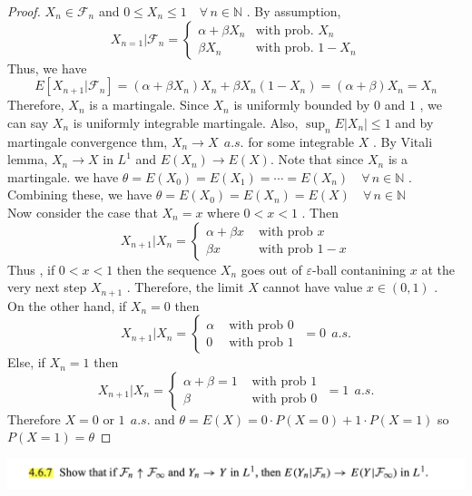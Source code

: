 \documentclass[12pt, A4]{article}
\newcommand{\N}{\mathbb{N}}
\newcommand{\F}{\mathcal{F}}
\newcommand{\foranyn}{\quad \forall \, n\in \N}
\begin{document}
\begin{proof}
   $X_n\in \F_n$ and $0\leq X_n\leq 1\foranyn$ . By assumption, 
   $$X_{n=1}|\F_n = \begin{cases}
    \alpha +\beta X_n & \text{with prob. } X_n \\ \beta X_n & \text{with prob. } 1-X_n      
   \end{cases}
   $$
   Thus, we have $$E[X_{n+1}|\F_n] = (\alpha+\beta X_n)X_n +\beta X_n(1-X_n) = (\alpha+\beta)X_n = X_n $$
   Therefore, $X_n$ is a martingale. Since $X_n$ is uniformly bounded by $0$ and $1$ , we can say $X_n$ is uniformly integrable martingale. Also, $\sup_n E|X_n|\leq 1$ and by martingale convergence thm, $X_n\rightarrow X\;\,a.s.$ for some integrable $X$ . By Vitali lemma, $X_n\rightarrow X$ in $L^1$ and $E(X_n)\rightarrow E(X)$. Note that since $X_n$ is a martingale. we have $\theta = E(X_0) = E(X_1) = \cdots = E(X_n)\foranyn$ . Combining these, we have $\theta = E(X_0) = E(X_n) = E(X)\foranyn$ \\
   Now consider the case that $X_n = x$ where $0<x<1$ . Then $$ X_{n+1} |X_n =\begin{cases}
       \alpha + \beta x & \text{ with prob } x \\ \beta x & \text{ with prob } 1-x
   \end{cases} $$
   Thus , if $0<x<1$ then the sequence $X_n$ goes out of $\varepsilon$-ball contanining $x$ at the very next step $X_{n+1}$ . Therefore, the limit $X$ cannot have value $x \in (0,1)$ . \\ On the other hand, if $X_n = 0 $ then $$X_{n+1}|X_n =\begin{cases}
       \alpha & \text{ with prob } 0 \\ 0 & \text{ with prob } 1 
   \end{cases} \;= 0\;\,a.s.$$ Else, if $X_n = 1$ then $$X_{n+1}|X_n =\begin{cases}
    \alpha+\beta =1 & \text{ with prob } 1 \\ \beta & \text{ with prob } 0  
\end{cases} \;= 1\;\,a.s.$$ Therefore $X = 0$ or $1\;\,a.s.$ and $\theta =  E(X) = 0 \cdot P(X=0) + 1 \cdot P(X=1)$ so $P(X=1) =\theta$
\end{proof}

\vspace{1cm}

\includegraphics[width=17cm]{Exer4.6.7.png}
\end{document}
